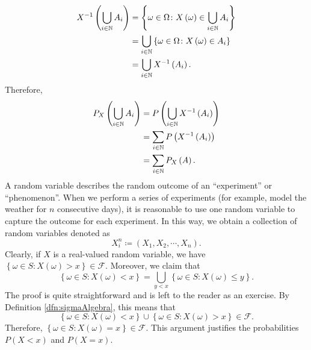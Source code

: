 \documentclass[math, code]{amznotes}
\theoremstyle{remark}
\begin{document}
\begin{align*}
    X^{-1}\left(\bigcup_{i \in \mathbb{N}}A_i\right) & = \left\{\omega \in \Omega \colon X\left(\omega\right) \in \bigcup_{i \in \mathbb{N}}A_i\right\} \\
    & = \bigcup_{i \in \mathbb{N}}\left\{\omega \in \Omega \colon X\left(\omega\right) \in A_i\right\} \\
    & = \bigcup_{i \in \mathbb{N}}X^{-1}\left(A_i\right).
\end{align*}
Therefore, 
\begin{align*}
    P_X\left(\bigcup_{i \in \mathbb{N}}A_i\right) & = P\left(\bigcup_{i \in \mathbb{N}}X^{-1}\left(A_i\right)\right) \\
    & = \sum_{i \in \mathbb{N}}P\left(X^{-1}\left(A_i\right)\right) \\
    & = \sum_{i \in \mathbb{N}}P_X\left(A\right).
\end{align*}
A random variable describes the random outcome of an ``experiment'' or ``phenomenon''. When we perform a series of experiments (for example, model the weather for $n$ consecutive days), it is reasonable to use one random variable to capture the outcome for each experiment. In this way, we obtain a collection of random variables denoted as 
\begin{equation*}
    X_i^n \coloneqq \left(X_1, X_2, \cdots, X_n\right).
\end{equation*}
Clearly, if $X$ is a real-valued random variable, we have $\left\{\omega \in S \colon X\left(\omega\right) > x\right\} \in \mathcal{F}$. Moreover, we claim that 
\begin{equation*}
    \left\{\omega \in S \colon X\left(\omega\right) < x\right\} = \bigcup_{y < x}\left\{\omega \in S \colon X\left(\omega\right) \leq y\right\}.
\end{equation*}
The proof is quite straightforward and is left to the reader as an exercise. By Definition \ref{dfn:sigmaAlgebra}, this means that 
\begin{equation*}
    \left\{\omega \in S \colon X\left(\omega\right) < x\right\} \cup \left\{\omega \in S \colon X\left(\omega\right) > x\right\} \in \mathcal{F}.
\end{equation*}
Therefore, $\left\{\omega \in S \colon X\left(\omega\right) = x\right\} \in \mathcal{F}$. This argument justifies the probabilities $P\left(X < x\right)$ and $P\left(X = x\right)$. 
\end{document}
